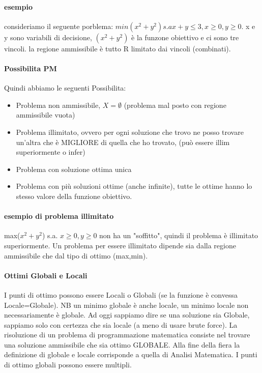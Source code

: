 \documentclass[12pt, a4paper, openany]{book}
\begin{document}
\paragraph*{esempio} consideriamo il seguente porblema: $min (x^2+y^2) s.a x+y\leq 3, x\geq 0, y\geq0$. 
x e y sono variabili di decisione, $(x^2+y^2)$ è la funzone obiettivo e ci sono tre vincoli. la regione ammissibile è tutto R limitato dai vincoli (combinati).
\paragraph*{Possibilita PM} Quindi abbiamo le seguenti Possibilita:
\begin{itemize}
    \item Problema non ammissibile, $X = \emptyset$ (problema mal posto con regione ammissibile vuota)
    \item Problema illimitato, ovvero per ogni soluzione che trovo ne posso trovare un'altra che è MIGLIORE di quella che ho trovato, (può essere illim superiormente o infer)
    \item Problema con soluzione ottima unica
    \item Problema con più soluzioni ottime (anche infinite), tutte le ottime hanno lo stesso valore della funzione obiettivo.
\end{itemize}
\paragraph*{esempio di problema illimitato } max($x^2+y^2$) s.a. $x\geq 0,y\geq 0$ non ha un "soffitto", quindi il problema è illimitato superiormente. Un problema per essere illimitato dipende sia dalla regione ammissibile che dal tipo di ottimo (max,min).


\paragraph*{Ottimi Globali e Locali} I punti di ottimo possono essere Locali o Globali (se la funzione è convessa Locale=Globale). NB un minimo globale è anche locale, un minimo locale non necessariamente è globale.
Ad oggi sappiamo dire se una soluzione sia Globale, sappiamo solo con certezza che sia locale (a meno di usare brute force).
La risoluzione di un problema di programmazione matematica consiste nel trovare una soluzione ammissibile che sia ottimo GLOBALE.
Alla fine della fiera la definizione di globale e locale corrisponde a quella di Analisi Matematica.
I punti di ottimo globali possono essere multipli.
\end{document}
